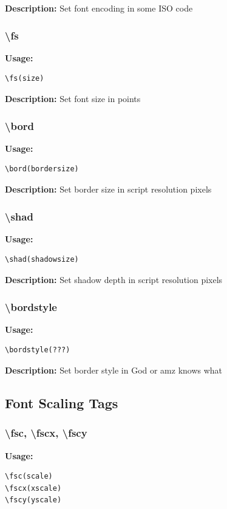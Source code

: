 \documentclass{spec}
\begin{document}
\textbf{Description:}
Set font encoding in some ISO code

\subsubsection{\textbackslash fs}
\textbf{Usage:}
\begin{verbatim}
\fs(size)
\end{verbatim}

\textbf{Description:}
Set font size in points

\subsubsection{\textbackslash bord}
\textbf{Usage:}
\begin{verbatim}
\bord(bordersize)
\end{verbatim}

\textbf{Description:}
Set border size in script resolution pixels

\subsubsection{\textbackslash shad}
\textbf{Usage:}
\begin{verbatim}
\shad(shadowsize)
\end{verbatim}

\textbf{Description:}
Set shadow depth in script resolution pixels

\subsubsection{\textbackslash bordstyle}
\textbf{Usage:}
\begin{verbatim}
\bordstyle(???)
\end{verbatim}

\textbf{Description:}
Set border style in God or amz knows what

\subsection{Font Scaling Tags}

\subsubsection{\textbackslash fsc, \textbackslash fscx, \textbackslash fscy}
\textbf{Usage:}
\begin{verbatim}
\fsc(scale)
\fscx(xscale)
\fscy(yscale)
\end{verbatim}
\end{document}
